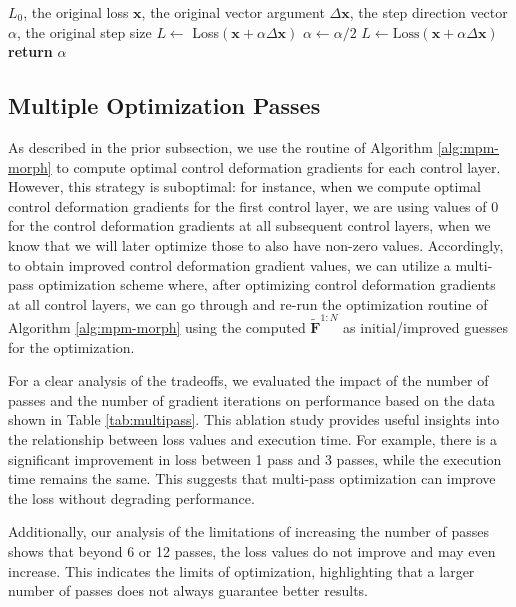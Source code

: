     \begin{algorithm}
    \begin{algorithmic}[1]
        \Require $L_0$, the original loss
        \Require $\mathbf{x}$, the original vector argument
        \Require $\Delta \mathbf{x}$, the step direction vector
        \Require $\alpha$, the original step size
        \State $L \leftarrow $ Loss$(\mathbf{x} + \alpha \Delta \mathbf{x})$
            \State $\alpha \leftarrow \alpha / 2$
            \State $L \leftarrow \text{Loss}(\mathbf{x} + \alpha \Delta \mathbf{x})$
        \EndWhile
        \State \textbf{return} $\alpha$ 
        \end{algorithmic}
    \caption{ComputeStepSize ($L_0$, $\mathbf{x}$, $\Delta \mathbf{x}$, $\alpha$)}\label{alg:linesearch}
    \end{algorithm}
    
\subsection{Multiple Optimization Passes}
    As described in the prior subsection, we use the routine of Algorithm \ref{alg:mpm-morph} to compute optimal control deformation gradients for each control layer.
    However, this strategy is suboptimal: for instance, when we compute optimal control deformation gradients for the first control layer, we are using values of 0 for the control deformation gradients at all subsequent control layers, when we know that we will later optimize those to also have non-zero values.
    Accordingly, to obtain improved control deformation gradient values, we can utilize a multi-pass optimization scheme where, after optimizing control deformation gradients at all control layers, we can go through and re-run the optimization routine of Algorithm \ref{alg:mpm-morph} using the computed $\tilde{\mathbf{F}}^{1:N}$ as initial/improved guesses for the optimization.
    
    For a clear analysis of the tradeoffs, we evaluated the impact of the number of passes and the number of gradient iterations on performance based on the data shown in Table \ref{tab:multipass}. This ablation study provides useful insights into the relationship between loss values and execution time. For example, there is a significant improvement in loss between 1 pass and 3 passes, while the execution time remains the same. This suggests that multi-pass optimization can improve the loss without degrading performance.

    Additionally, our analysis of the limitations of increasing the number of passes shows that beyond 6 or 12 passes, the loss values do not improve and may even increase. This indicates the limits of optimization, highlighting that a larger number of passes does not always guarantee better results.
    
